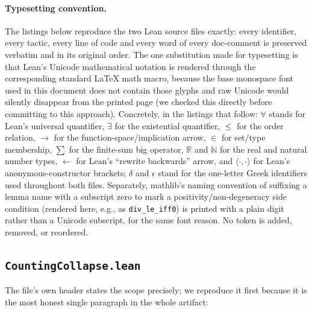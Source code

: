 \documentclass[11pt]{article}
\begin{document}
\paragraph{Typesetting convention.} The listings below reproduce the two Lean
source files exactly: every identifier, every tactic, every line of code and
every word of every doc-comment is preserved verbatim and in its original
order. The one substitution made for typesetting is that Lean's Unicode
mathematical notation is rendered through the corresponding standard \LaTeX{}
math macro, because the base monospace font used in this document does not
contain those glyphs and raw Unicode would silently disappear from the printed
page (we checked this directly before committing to this approach). Concretely,
in the listings that follow: $\forall$ stands for Lean's universal quantifier,
$\exists$ for the existential quantifier, $\le$ for the order relation,
$\to$ for the function-space/implication arrow, $\in$ for set/type
membership, $\sum$ for the finite-sum big operator, $\mathbb{R}$ and
$\mathbb{N}$ for the real and natural number types, $\leftarrow$ for Lean's
``rewrite backwards'' arrow, and $\langle\cdot,\cdot\rangle$ for Lean's
anonymous-constructor brackets; $\delta$ and $\epsilon$ stand for the
one-letter Greek identifiers used throughout both files. Separately,
mathlib's naming convention of suffixing a lemma name with a subscript zero
to mark a positivity/non-degeneracy side condition (rendered here, e.g., as
\texttt{div\_le\_iff0}) is printed with a plain digit rather than a Unicode
subscript, for the same font reason. No token is added, removed, or
reordered.

\subsection{\texttt{CountingCollapse.lean}}
\label{sec:s1-counting}

The file's own header states the scope precisely; we reproduce it first
because it is the most honest single paragraph in the whole artifact:
\end{document}
